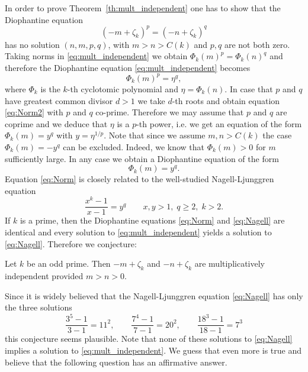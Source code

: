 In order to prove Theorem~\ref{th:mult_independent} one has to show
that the Diophantine equation
\begin{equation}\label{eq:mult_independent}
(-m+\zeta_k)^p=(-n+\zeta_k)^q
\end{equation}
has no solution $(n,m,p,q)$, with $m>n>C(k)$ and $p,q$ are not both
zero. Taking norms in \eqref{eq:mult_independent} we obtain
$\Phi_k(m)^p=\Phi_k(n)^q$ and therefore the Diophantine equation
\eqref{eq:mult_independent} becomes
\begin{equation}\label{eq:Norm2}
\Phi_k(m)^p=\eta^q,
\end{equation}
where $\Phi_k$ is the $k$-th cyclotomic polynomial and
$\eta=\Phi_k(n)$. In case that $p$ and $q$ have
greatest common divisor $d>1$ we take $d$-th roots and obtain equation
\eqref{eq:Norm2} with $p$ and $q$ co-prime. Therefore we may assume
that $p$ and $q$ are coprime and we deduce that
$\eta$ is a $p$-th power, i.e.  we get an equation of the form
$\Phi_k(m)=y^q$ with $y=\eta^{1/p}$.   Note that since we assume
$m,n>C(k)$ the case $\Phi_k(m)=-y^q$ can be excluded. Indeed, we know
that $\Phi_k(m)>0$ for $m$ sufficiently large. In any case we obtain a
Diophantine equation of the form
\begin{equation}\label{eq:Norm}
\Phi_k(m)=y^q.
\end{equation}
Equation \eqref{eq:Norm} is closely related to the well-studied Nagell-Ljunggren equation
\begin{equation}\label{eq:Nagell}
\frac{x^k-1}{x-1}=y^q\qquad x,y>1,\; q\geq 2, \; k>2.
\end{equation}
If $k$ is a prime, then the Diophantine equations \eqref{eq:Norm} and \eqref{eq:Nagell} are identical and every solution to \eqref{eq:mult_independent} yields 
a solution to \eqref{eq:Nagell}. Therefore we conjecture: 

\begin{conjecture}
Let $k$ be an odd prime. Then $-m+\zeta_k$ and $-n+\zeta_k$ are multiplicatively independent provided $m>n>0$.
\end{conjecture}

Since it is widely believed that the Nagell-Ljunggren equation \eqref{eq:Nagell} has only the three solutions
\[\frac{3^5-1}{3-1}=11^2,\qquad \frac{7^4-1}{7-1}=20^2, \qquad \frac{18^3-1}{18-1}=7^3\]
this conjecture seems plausible. Note that none of these solutions to \eqref{eq:Nagell} implies a solution to \eqref{eq:mult_independent}. We guess that even 
more 
is true and believe that the following question has an affirmative answer.

